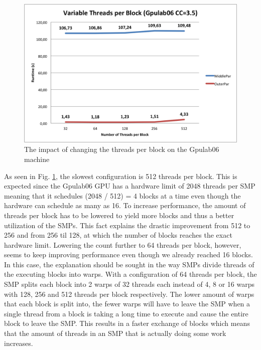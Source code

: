 \begin{figure}
\begin{center}
	\includegraphics[width=\textwidth]{img/Gpulab-tpb35.png}
\end{center}
\caption{The impact of changing the threads per block on the Gpulab06 machine}
\label{ThreadsPerBlockGraph}
\end{figure}

\noindent As seen in Fig. \ref{ThreadsPerBlockGraph}, the slowest configuration is 512 threads per block. This is expected since the Gpulab06 GPU has a hardware limit of 2048 threads per SMP meaning that it schedules (2048 / 512) = 4 blocks at a time even though the hardware can schedule as many as 16. To increase performance, the amount of threads per block has to be lowered to yield more blocks and thus a better utilization of the SMPs. This fact explains the drastic improvement from 512 to 256 and from 256 til 128, at which the number of blocks reaches the exact hardware limit. Lowering the count further to 64 threads per block, however, seems to keep improving performance even though we already reached 16 blocks. \\

In this case, the explanation should be sought in the way SMPs divide threads of the executing blocks into warps. With a configuration of 64 threads per block, the SMP splits each block into 2 warps of 32 threads each instead of 4, 8 or 16 warps with 128, 256 and 512 threads per block respectively. The lower amount of warps that each block is split into, the fewer warps will have to leave the SMP when a single thread from a block is taking a long time to execute and cause the entire block to leave the SMP. This results in a faster exchange of blocks which means that the amount of threads in an SMP that is actually doing some work increases. \\

